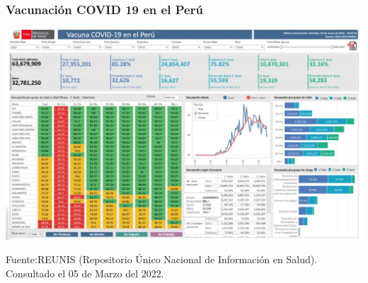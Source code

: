 \documentclass[xcolor=table]{beamer}
\begin{document}
\begin{frame}
	\frametitle{Vacunación COVID 19 en el Perú}
	\vspace{-.5cm}
	\begin{center}
		\includegraphics[width=1\linewidth]{../sala_nacional/vacunas_nacional.jpeg} 
	\end{center}

	{\tiny Fuente:REUNIS (Repositorio Único Nacional de Información en Salud). Consultado el 05 de Marzo del 2022.\\} 
	\vspace{0.01cm}
\end{frame}
\end{document}
